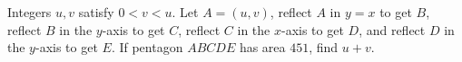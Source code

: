 Integers $u,v$ satisfy $0<v<u$. Let $A=(u,v)$, reflect $A$ in $y=x$ to get $B$, reflect $B$ in the $y$-axis to get $C$, reflect $C$ in the $x$-axis to get $D$, and reflect $D$ in the $y$-axis to get $E$. If pentagon $ABCDE$ has area $451$, find $u+v$.
